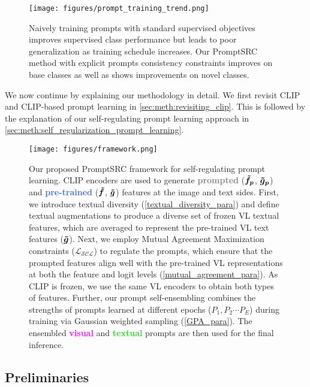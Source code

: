 \documentclass[10pt,twocolumn,letterpaper]{article}
\begin{document}
\begin{figure}[!t]
    \centering
    \texttt{[image: figures/prompt\_training\_trend.png]}\vspace{-0.5em}
\caption{Naively training prompts with standard supervised objectives improves supervised class performance but leads to poor generalization as training schedule increases. Our PromptSRC method with explicit prompts consistency constraints improves on base classes as well as shows improvements on novel classes.}
  \label{fig:prompt_ovefitting}\end{figure}


We now continue by explaining our methodology in detail. We first revisit CLIP and CLIP-based prompt learning in \autoref{sec:meth:revisiting_clip}. This is followed by the explanation of our self-regulating prompt learning approach in \autoref{sec:meth:self_regularization_prompt_learning}.

\begin{figure*}[!ht]
\centering
{\texttt{[image: figures/framework.png]}}\vspace{-0.5em}
\caption{Our proposed PromptSRC framework for self-regulating prompt learning. CLIP encoders are used to generate \textbf{\textcolor{gray}{prompted}} ($\bm{\Tilde{f}_p}$, $\bm{\Tilde{g}_p}$) and \textbf{\textcolor{RoyalBlue}{pre-trained}} ($\bm{\Tilde{f}}$, $\bm{\Tilde{g}}$) features at the image and text sides. First, we introduce textual diversity (\cref{textual_diversity_para}) and define textual augmentations to produce a diverse set of frozen VL textual features, which are averaged to represent the pre-trained VL text features ($\bm{\Tilde{g}}$). Next, we employ Mutual Agreement Maximization constraints ($\mathcal{L_{\text{SCL}}}$) to regulate the prompts, which ensure that the prompted features align well with the pre-trained VL representations at both the feature and logit levels (\cref{mutual_agreement_para}). As CLIP is frozen, we use the same VL encoders to obtain both types of features. Further, our prompt self-ensembling combines the strengths of prompts learned at different epochs ($P_1, P_2 \cdots P_E$) during training via Gaussian weighted sampling (\cref{GPA_para}). The ensembled \textbf{\textcolor{Magenta}{visual}} and \textbf{\textcolor{LimeGreen}{textual}} prompts are then used for the final inference.}
\label{fig:main_figure}
\end{figure*}

\subsection{Preliminaries}
\label{sec:meth:revisiting_clip}
\end{document}
